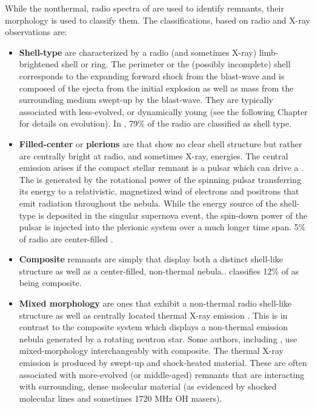 While the nonthermal, radio \sync{} spectra of  \snrs{} are used to identify remnants, their morphology is used to classify them. The classifications, based on radio and X-ray observations are:
\begin{itemize}
	\item \textbf{ Shell-type} \snrs{} are characterized by a radio (and sometimes X-ray) limb-brightened shell or ring. The perimeter or the (possibly incomplete) shell corresponds to the expanding forward shock from the blast-wave and is composed of the ejecta from the initial explosion as well as mass from the surrounding medium swept-up by the blast-wave. They are typically associated with less-evolved, or dynamically young \snrs{} (see the following Chapter for details on \snr{} evolution). In \cite{Green14}, 79\% of the radio \snrs{} are classified as shell type. 
	
	\item \textbf{Filled-center} \snrs{} or \textbf{plerions} are \snrs{} that show no clear shell structure but  rather are centrally bright at radio, and sometimes X-ray, energies. The central \sync{} emission arises if the  compact stellar remnant is a pulsar which can drive a \pwn{} \cite{Gaensler06}. The \pwn{} is generated by the rotational power of the spinning pulsar transferring its energy to a relativistic, magnetized wind of electrons and positrons that emit \sync{} radiation throughout the nebula. While the energy source of the shell-type \snr{} is deposited in the singular supernova event, the spin-down power of the pulsar is injected into the plerionic system over a much longer time span. 5\% of radio \snrs{} are center-filled \citep{Green14}.
	\item \textbf{Composite} remnants are simply \snrs{} that display both a  distinct shell-like structure as well as a center-filled, non-thermal \sync{} nebula.. \cite{Green14} classifies 12\% of \snrs{} as being composite.
	
	\item \textbf{Mixed morphology} \snrs{} are ones that exhibit a non-thermal radio shell-like structure as well as centrally located thermal X-ray emission \citep{Rho98}. This is in contrast to the composite system which displays a non-thermal emission nebula generated by a rotating neutron star. Some authors, including \cite{Green14}, use mixed-morphology interchangeably with composite. The thermal X-ray emission is produced by swept-up and shock-heated  material. These \snrs{} are often associated with more-evolved (or middle-aged) remnants that are interacting with surrounding, dense molecular material (as evidenced by shocked molecular lines and sometimes 1720 MHz OH masers). 
\end{itemize}

